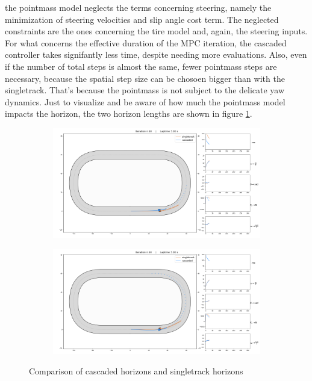 \documentclass[a4paper, onecolumn, 11pt]{article}
\begin{document}
the pointmass model neglects the terms concerning steering, namely the
minimization of steering velocities and slip angle cost term. The neglected
constraints are the ones concerning the tire model and, again, the steering
inputs. For what concerns the effective duration of the MPC iteration, the
cascaded controller takes signifantly less time, despite needing more
evaluations. Also, even if the number of total steps is almost the same,
fewer pointmass steps are necessary, because the spatial step size can be
chosoen bigger than with the singletrack. That's because the pointmass is not
subject to the delicate yaw dynamics. Just to visualize and be aware of how much
the pointmass model impacts the horizon, the two horizon lengths are shown in
figure \ref{horizons}.
\begin{figure}[H] 
    \centering
        \begin{subfigure}{0.85\textwidth} 
        \centering
        \includegraphics[width=\textwidth]{assets/im/fig2_50.png}
    \end{subfigure}
    \begin{subfigure}{0.85\textwidth}
        \centering
        \includegraphics[width=\textwidth]{assets/im/fig2_60.png}
    \end{subfigure}
    \caption[short]{Comparison of cascaded horizons and singletrack horizons}
    \label{horizons}
\end{figure}
\end{document}
